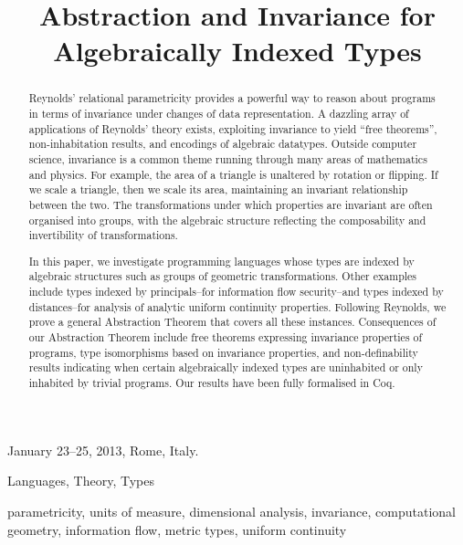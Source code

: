 \documentclass{sigplanconf}
\title{Abstraction and Invariance for Algebraically Indexed Types}
\theoremstyle{examplestyle}
\theoremstyle{restatementstyle}
\begin{document}
 {January 23--25, 2013, Rome, Italy.}

\maketitle

\begin{abstract}
  Reynolds' relational parametricity provides a powerful way to reason
  about programs in terms of invariance under changes of data
  representation. A dazzling array of applications of Reynolds' theory
  exists, exploiting invariance to yield ``free theorems'',
  non-inhabitation results, and encodings of algebraic datatypes.
  Outside computer science, invariance is a common theme running
  through many areas of mathematics and physics. For example, the area of
  a triangle is unaltered by rotation or flipping. If we scale a
  triangle, then we scale its area, maintaining an invariant
  relationship between the two. The transformations under which
  properties are invariant are often organised into groups, with the
  algebraic structure reflecting the composability and invertibility
  of transformations.

  In this paper, we investigate programming languages whose types are
  indexed by algebraic structures such as groups of geometric
  transformations. Other examples include types indexed by
  principals--for information flow security--and types indexed by
  distances--for analysis of analytic uniform continuity
  properties. Following Reynolds, we prove a general Abstraction
  Theorem that covers all these instances. Consequences of our
  Abstraction Theorem include free theorems expressing invariance
  properties of programs, type isomorphisms based on invariance
  properties, and non-definability results indicating when certain
  algebraically indexed types are uninhabited or only inhabited by
  trivial programs.  Our results have been fully formalised in Coq.
\end{abstract}

  

\terms
  Languages, Theory, Types

\keywords parametricity, units of measure, dimensional analysis,
invariance, computational geometry, information flow, metric types, uniform continuity
\end{document}

